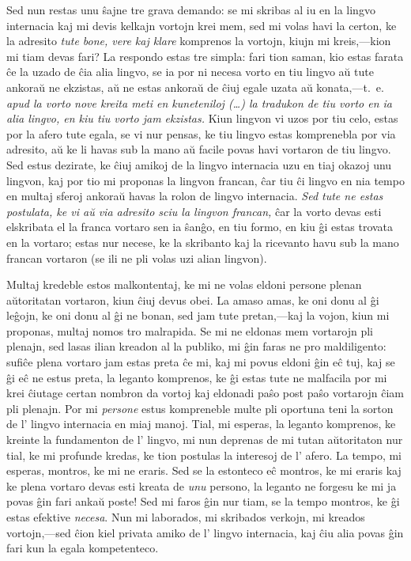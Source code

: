 \documentclass[12pt,twoside]{book}
\begin{document}
Sed nun restas unu ŝajne tre grava demando: se mi skribas al iu en la lingvo internacia kaj mi devis kelkajn vortojn krei mem, sed mi volas havi la certon, ke la adresito \emph{tute bone, vere kaj klare} komprenos la vortojn, kiujn mi kreis,—kion mi tiam devas fari? La respondo estas tre simpla: fari tion saman, kio estas farata ĉe la uzado de ĉia alia lingvo, se ia por ni necesa vorto en tiu lingvo aŭ tute ankoraŭ ne ekzistas, aŭ ne estas ankoraŭ de ĉiuj egale uzata aŭ konata,—t.~e. \emph{apud la vorto nove kreita meti en kuneteniloj (\ldots{}) la tradukon de tiu vorto en ia alia lingvo, en kiu tiu vorto jam ekzistas.} Kiun lingvon vi uzos por tiu celo, estas por la afero tute egala, se vi nur pensas, ke tiu lingvo estas komprenebla por via adresito, aŭ ke li havas sub la mano aŭ facile povas havi vortaron de tiu lingvo. Sed estus dezirate, ke ĉiuj amikoj de la lingvo internacia uzu en tiaj okazoj unu lingvon, kaj por tio mi proponas la lingvon francan, ĉar tiu ĉi lingvo en nia tempo en multaj sferoj ankoraŭ havas la rolon de lingvo internacia. \emph{Sed tute ne estas postulata, ke vi aŭ via adresito sciu la lingvon francan,} ĉar la vorto devas esti elskribata el la franca vortaro sen ia ŝanĝo, en tiu formo, en kiu ĝi estas trovata en la vortaro; estas nur necese, ke la skribanto kaj la ricevanto havu sub la mano francan vortaron (se ili ne pli volas uzi alian lingvon).

Multaj kredeble estos malkontentaj, ke mi ne volas eldoni persone plenan aŭtoritatan vortaron, kiun ĉiuj devus obei. La amaso amas, ke oni donu al ĝi leĝojn, ke oni donu al ĝi ne bonan, sed jam tute pretan,—kaj la vojon, kiun mi proponas, multaj nomos tro malrapida. Se mi ne eldonas mem vortarojn pli plenajn, sed lasas ilian kreadon al la publiko, mi ĝin faras ne pro maldiligento: sufiĉe plena vortaro jam estas preta ĉe mi, kaj mi povus eldoni ĝin eĉ tuj, kaj se ĝi eĉ ne estus preta, la leganto komprenos, ke ĝi estas tute ne malfacila por mi krei ĉiutage certan nombron da vortoj kaj eldonadi paŝo post paŝo vortarojn ĉiam pli plenajn. Por mi \emph{persone} estus kompreneble multe pli oportuna teni la sorton de l' lingvo internacia en miaj manoj. Tial, mi esperas, la leganto komprenos, ke kreinte la fundamenton de l' lingvo, mi nun deprenas de mi tutan aŭtoritaton nur tial, ke mi profunde kredas, ke tion postulas la interesoj de l' afero. La tempo, mi esperas, montros, ke mi ne eraris. Sed se la estonteco eĉ montros, ke mi eraris kaj ke plena vortaro devas esti kreata de \emph{unu} persono, la leganto ne forgesu ke mi ja povas ĝin fari ankaŭ poste! Sed mi faros ĝin nur tiam, se la tempo montros, ke ĝi estas efektive \emph{necesa}. Nun mi laborados, mi skribados verkojn, mi kreados vortojn,—sed ĉion kiel privata amiko de l' lingvo internacia, kaj ĉiu alia povas ĝin fari kun la egala kompetenteco.
\end{document}
